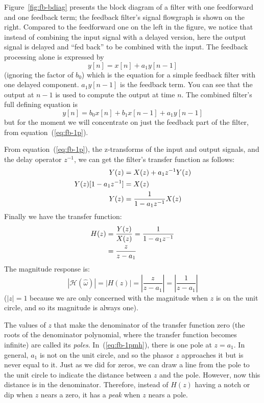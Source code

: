 Figure~\ref{fig:fb-bdiag} presents the block diagram of a filter with
one feedforward and one feedback term; the feedback filter's signal
flowgraph is shown on the right. Compared to the feedforward one on
the left in the figure, we notice that instead of combining the input
signal with a delayed version, here the output signal is delayed and
``fed back'' to be combined with the input. The feedback processing
alone is expressed by
\begin{equation}
y[n] = x[n] + a_1 y[n-1]
\label{eq:fb-1p}
\end{equation}
(ignoring the factor of $b_0$) which is the equation for a simple
feedback filter with one delayed component. $a_1 y[n-1]$ is the
feedback term. You can see that the output at $n-1$ is used to compute
the output at time $n$. The combined filter's full defining equation
is
\begin{equation}
  y[n] = b_0 x[n] + b_1 x[n-1] + a_1 y[n-1]
  \label{eq:fb-ff}
\end{equation}
but for the moment we will concentrate on just the feedback part of
the filter, from equation~(\ref{eq:fb-1p}).

From equation~(\ref{eq:fb-1p}), the z-transforms of the input and
output signals, and the delay operator $z^{-1}$, we can get the
filter's transfer function as follows:
\begin{align}
Y(z) &= X(z) + a_1z^{-1}Y(z) \notag\\
Y(z)[1-a_1z^{-1}] &= X(z) \notag\\
Y(z) &= \frac{1}{1-a_1z^{-1}}X(z)
\end{align}
Finally we have the transfer function:
\begin{align}
H(z) &= \frac{Y(z)}{X(z)} = \frac{1}{1-a_1z^{-1}} \notag \\
     &= \frac{z}{z-a_1} \label{eq:fb-xfer}
\end{align}
The magnitude response is:
\begin{equation}
|\mathcal{H}(\hat{\omega})|
  = |H(z)|
  = \left|\frac{z}{z-a_1}\right|=\left|\frac{1}{z-a_1}\right|
\label{eq:fb-1pmh}
\end{equation}
($|z|=1$ because we are only concerned with the magnitude when $z$ is
on the unit circle, and so its magnitude is always one).

 The values of $z$ that make the denominator
of the transfer function zero (the roots of the denominator
polynomial, where the transfer function becomes infinite) are called
its \emph{poles}. In~(\ref{eq:fb-1pmh}), there is one pole at
$z=a_1$. In general, $a_1$ is not on the unit circle, and so the
phasor $z$ approaches it but is never equal to it.  Just as we did for
zeros, we can draw a line from the pole to the unit circle to indicate
the distance between $z$ and the pole.  However, now this distance is
in the denominator. Therefore, instead of $H(z)$ having a notch or dip
when $z$ nears a zero, it has a \emph{peak} when $z$ nears a pole.

